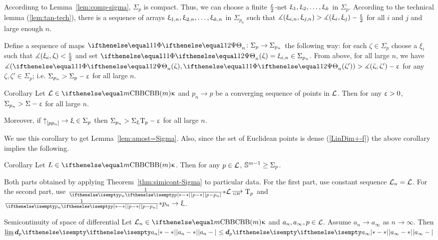 Accordinng to Lemma~\ref{lem:comp-sigma}, $\Sigma_p$ is compact.
Thus, we can choose a finite $\tfrac{\upvarepsilon}2$-net $\xi_1,\xi_2,\dots,\xi_\kay$ in $\Sigma_p$. 
According to the technical lemma (\ref{lem:tan-tech}), there is a sequence of arrays $\xi_{1,n},\xi_{2,n},\dots,\xi_{\kay,n}$ in $\Sigma_{p_n}$ 
such that $\mangle(\xi_{i,n},\xi_{j,n})\z>\mangle(\xi_i,\xi_j)-\tfrac\eps2$ for all $i$ and $j$ and large enough $n$.

Define a sequence of maps $\map_n\:\Sigma_p\to\Sigma_{p_n}$ the following way:
for each $\zeta\in\Sigma_p$ choose a $\xi_i$ such that $\measuredangle(\upxi_i,\upzeta)<\tfrac{\upvarepsilon}2$ and set $\map_n(\zeta)=\xi_{i,n}\in\Sigma_{p_n}$.
From above, for all large $n$, we have $\mangle(\map_n(\zeta),\map_n(\zeta'))>\mangle(\zeta,\zeta')-\eps$ for any $\zeta,\zeta'\in \Sigma_p$;
i.e. $\Sigma_{p_n}>\Sigma_p-\upvarepsilon$ for all large $n$.\qeds

\begin{thm}{Corollary}\label{cor:simicont-Sigma}
Let $\spc{L}\in\Alex m\kappa$ and $p_n\to p$ be a converging sequence of points in $\mathcal{L}$.
Then for any $\upvarepsilon>0$, $\Sigma_{p_n}>\Sigma -\upvarepsilon$ for all large $n$.

Moreover, if $\dir{p}{p_n}\to\xi\in \Sigma_p$ then $\Sigma_{p_n}>\Sigma_\upxi \text{\rm T}_p-\upvarepsilon$ for all large $n$.
\end{thm}

We use this corollary to get Lemma~\ref{lem:amost=Sigma}.
Also, since the set of Euclidean points is dense (\ref{LinDim+-f})
the above corollary implies the following.

\begin{thm}{Corollary}\label{cor:S>Sigma}
Let $L\in\Alex m\kappa$.
Then for any $p\in \spc{L}$, 
$\SS^{m-1}\ge \Sigma_p$.
\end{thm}

Both parts obtained by applying Theorem~\ref{thm:simicont-Sigma} to particular data.
For the first part, use constant sequence $\mathcal{L}_n=\mathcal{L}$.
For the second part, use $\tfrac{1}{\dist{p}{p_n}{}}\blow\spc{L}\GHto \T_p$ 
and 
$\tfrac{1}{\dist{p}{p_n}{}}\blow p_n\to\xi$.%
\qeds

\begin{thm}{Semicontinuity of space of differential}\label{thm:simicont-differential}
Let $\spc{L}_n\in\Alex m\kappa$ and  $a_n,a_\infty, p\in \spc{L}$.
Assume $a_n\to a_\infty$ as $n\to\infty$.
Then $\liminf\dd_p\dist{a_n}{}{}\le \dd_p\dist{a_\infty}{}{}$
\end{thm}

